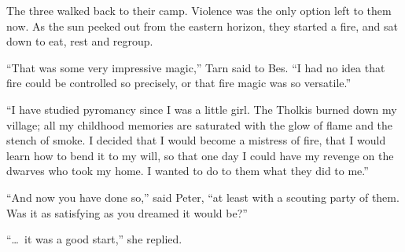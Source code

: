 The three walked back to their camp.  Violence was the only option left to them now.  As the sun peeked out from the eastern horizon, they started a fire, and sat down to eat, rest and regroup.

``That was some very impressive magic,'' Tarn said to Bes.  ``I had no idea that fire could be controlled so precisely, or that fire magic was so versatile.''

``I have studied pyromancy since I was a little girl.  The Tholkis burned down my village; all my childhood memories are saturated with the glow of flame and the stench of smoke.  I decided that I would become a mistress of fire, that I would learn how to bend it to my will, so that one day I could have my revenge on the dwarves who took my home.  I wanted to do to them what they did to me.''

``And now you have done so,'' said Peter, ``at least with a scouting party of them.  Was it as satisfying as you dreamed it would be?''

``\ldots\ it was a good start,'' she replied.



